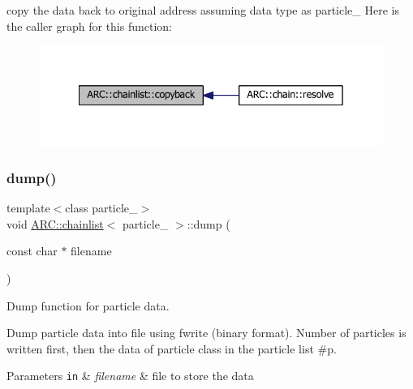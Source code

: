 copy the data back to original address assuming data type as particle\+\_\+ Here is the caller graph for this function\+:
\nopagebreak
\begin{figure}[H]
\begin{center}
\leavevmode
\includegraphics[width=342pt]{classARC_1_1chainlist_aba70559e1b70882256a7805744e22b25_icgraph}
\end{center}
\end{figure}
\hypertarget{classARC_1_1chainlist_a4b42fabdc7ff6edca56ce65b316f581f}{}\label{classARC_1_1chainlist_a4b42fabdc7ff6edca56ce65b316f581f} 
\subsubsection{\texorpdfstring{dump()}{dump()}}
{\footnotesize\ttfamily template$<$class particle\+\_\+$>$ \\
void \hyperlink{classARC_1_1chainlist}{A\+R\+C\+::chainlist}$<$ particle\+\_\+ $>$\+::dump (\begin{DoxyParamCaption}\item[{const char $\ast$}]{filename }\end{DoxyParamCaption})\hspace{0.3cm}{\ttfamily [inline]}}



Dump function for particle data. 

Dump particle data into file using fwrite (binary format). Number of particles is written first, then the data of particle class in the particle list \#p. 
\begin{DoxyParams}[1]{Parameters}
\mbox{\tt in}  & {\em filename} & file to store the data \\
\hline
\end{DoxyParams}
\hypertarget{classARC_1_1chainlist_a0e19bd06e5aa685e88948c947cd06552}{}\label{classARC_1_1chainlist_a0e19bd06e5aa685e88948c947cd06552} 
